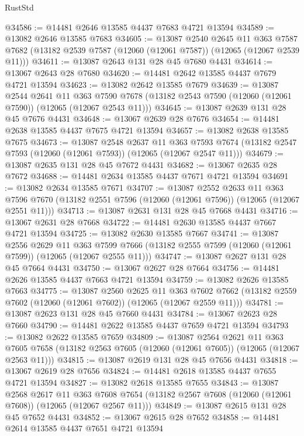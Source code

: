 \begin{lexlean}{RustStd}
\begin{coremodule}
@34586 := @14481 @2646 @13585 @4437 @7683 @4721 @13594
@34589 := @13082 @2646 @13585 @7683
@34605 := @13087
    @2540
    @2645
    @11
    @363
    @7587
    @7682
    (@13182 @2539 @7587 (@12060 (@12061 @7587)) (@12065 (@12067 @2539 @11)))
@34611 := @13087 @2643 @131 @28 @45 @7680 @4431
@34614 := @13067 @2643 @28 @7680
@34620 := @14481 @2642 @13585 @4437 @7679 @4721 @13594
@34623 := @13082 @2642 @13585 @7679
@34639 := @13087
    @2544
    @2641
    @11
    @363
    @7590
    @7678
    (@13182 @2543 @7590 (@12060 (@12061 @7590)) (@12065 (@12067 @2543 @11)))
@34645 := @13087 @2639 @131 @28 @45 @7676 @4431
@34648 := @13067 @2639 @28 @7676
@34654 := @14481 @2638 @13585 @4437 @7675 @4721 @13594
@34657 := @13082 @2638 @13585 @7675
@34673 := @13087
    @2548
    @2637
    @11
    @363
    @7593
    @7674
    (@13182 @2547 @7593 (@12060 (@12061 @7593)) (@12065 (@12067 @2547 @11)))
@34679 := @13087 @2635 @131 @28 @45 @7672 @4431
@34682 := @13067 @2635 @28 @7672
@34688 := @14481 @2634 @13585 @4437 @7671 @4721 @13594
@34691 := @13082 @2634 @13585 @7671
@34707 := @13087
    @2552
    @2633
    @11
    @363
    @7596
    @7670
    (@13182 @2551 @7596 (@12060 (@12061 @7596)) (@12065 (@12067 @2551 @11)))
@34713 := @13087 @2631 @131 @28 @45 @7668 @4431
@34716 := @13067 @2631 @28 @7668
@34722 := @14481 @2630 @13585 @4437 @7667 @4721 @13594
@34725 := @13082 @2630 @13585 @7667
@34741 := @13087
    @2556
    @2629
    @11
    @363
    @7599
    @7666
    (@13182 @2555 @7599 (@12060 (@12061 @7599)) (@12065 (@12067 @2555 @11)))
@34747 := @13087 @2627 @131 @28 @45 @7664 @4431
@34750 := @13067 @2627 @28 @7664
@34756 := @14481 @2626 @13585 @4437 @7663 @4721 @13594
@34759 := @13082 @2626 @13585 @7663
@34775 := @13087
    @2560
    @2625
    @11
    @363
    @7602
    @7662
    (@13182 @2559 @7602 (@12060 (@12061 @7602)) (@12065 (@12067 @2559 @11)))
@34781 := @13087 @2623 @131 @28 @45 @7660 @4431
@34784 := @13067 @2623 @28 @7660
@34790 := @14481 @2622 @13585 @4437 @7659 @4721 @13594
@34793 := @13082 @2622 @13585 @7659
@34809 := @13087
    @2564
    @2621
    @11
    @363
    @7605
    @7658
    (@13182 @2563 @7605 (@12060 (@12061 @7605)) (@12065 (@12067 @2563 @11)))
@34815 := @13087 @2619 @131 @28 @45 @7656 @4431
@34818 := @13067 @2619 @28 @7656
@34824 := @14481 @2618 @13585 @4437 @7655 @4721 @13594
@34827 := @13082 @2618 @13585 @7655
@34843 := @13087
    @2568
    @2617
    @11
    @363
    @7608
    @7654
    (@13182 @2567 @7608 (@12060 (@12061 @7608)) (@12065 (@12067 @2567 @11)))
@34849 := @13087 @2615 @131 @28 @45 @7652 @4431
@34852 := @13067 @2615 @28 @7652
@34858 := @14481 @2614 @13585 @4437 @7651 @4721 @13594

\end{coremodule}
\end{lexlean}
